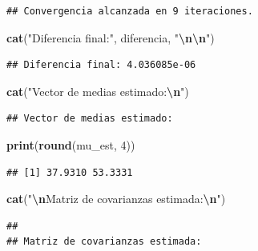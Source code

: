 \documentclass[
]{article}
\newenvironment{Shaded}{\begin{snugshade}}{\end{snugshade}}
\newcommand{\DecValTok}[1]{\textcolor[rgb]{0.00,0.00,0.81}{#1}}
\newcommand{\FunctionTok}[1]{\textcolor[rgb]{0.13,0.29,0.53}{\textbf{#1}}}
\newcommand{\NormalTok}[1]{#1}
\newcommand{\SpecialCharTok}[1]{\textcolor[rgb]{0.81,0.36,0.00}{\textbf{#1}}}
\newcommand{\StringTok}[1]{\textcolor[rgb]{0.31,0.60,0.02}{#1}}
\begin{document}
\begin{verbatim}
## Convergencia alcanzada en 9 iteraciones.
\end{verbatim}

\begin{Shaded}
\begin{Highlighting}[]
\FunctionTok{cat}\NormalTok{(}\StringTok{"Diferencia final:"}\NormalTok{, diferencia, }\StringTok{"}\SpecialCharTok{\textbackslash{}n\textbackslash{}n}\StringTok{"}\NormalTok{)}
\end{Highlighting}
\end{Shaded}

\begin{verbatim}
## Diferencia final: 4.036085e-06
\end{verbatim}

\begin{Shaded}
\begin{Highlighting}[]
\FunctionTok{cat}\NormalTok{(}\StringTok{"Vector de medias estimado:}\SpecialCharTok{\textbackslash{}n}\StringTok{"}\NormalTok{)}
\end{Highlighting}
\end{Shaded}

\begin{verbatim}
## Vector de medias estimado:
\end{verbatim}

\begin{Shaded}
\begin{Highlighting}[]
\FunctionTok{print}\NormalTok{(}\FunctionTok{round}\NormalTok{(mu\_est, }\DecValTok{4}\NormalTok{))}
\end{Highlighting}
\end{Shaded}

\begin{verbatim}
## [1] 37.9310 53.3331
\end{verbatim}

\begin{Shaded}
\begin{Highlighting}[]
\FunctionTok{cat}\NormalTok{(}\StringTok{"}\SpecialCharTok{\textbackslash{}n}\StringTok{Matriz de covarianzas estimada:}\SpecialCharTok{\textbackslash{}n}\StringTok{"}\NormalTok{)}
\end{Highlighting}
\end{Shaded}

\begin{verbatim}
## 
## Matriz de covarianzas estimada:
\end{verbatim}
\end{document}
